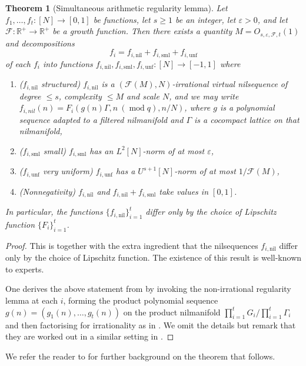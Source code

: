 \documentclass[10pt]{article}
\def\cF{\mathcal{F}}
\def\eps{\varepsilon}
\def\R{\mathbb{R}}
\def\nil{\mathrm{nil}}
\def\unf{\mathrm{unf}}
\def\sml{\mathrm{sml}}
\DeclareMathOperator\mo{mod}
\newtheorem{thm}[firstthm]{Theorem}
\begin{document}
\begin{thm}[Simultaneous arithmetic regularity lemma]\label{t:arl}
Let $f_1, \ldots, f_t: [N] \to [0,1]$ be functions, let $s \geq 1$ be an integer, let $\eps > 0$, and let $\cF: \R^+ \to \R^+$ be a growth function. Then there exists a quantity $M=O_{s,\eps,\cF,t}(1)$ and  decompositions 
\[f_i = f_{i,\nil} + f_{i,\sml} + f_{i,\unf} \]
of each $f_i$ into functions $f_{i, \nil}, f_{i, \sml}, f_{i,\unf}: [N] \to [-1,1]$ where 
\begin{enumerate}
\item($f_{i,\nil}$ structured) $f_{i,\nil}$ is a $(\cF(M), N)$-irrational virtual nilsequence of degree $\leq s$, complexity $\leq M$ and scale $N$, and we may write $f_{i,nil}(n) = F_i(g(n) \Gamma, n \ (\mo q), n/N)$, where $g$ is a polynomial sequence adapted to a filtered nilmanifold and $\Gamma$ is a cocompact lattice on that nilmanifold,
\item($f_{i,\sml}$ small) $f_{i,\sml}$ has an $L^2[N]$-norm of at most $\eps$,
\item($f_{i,\unf}$ very uniform) $f_{i,\unf}$ has a $U^{s+1}[N]$-norm of at most $1/\cF(M)$,
\item(Nonnegativity) $f_{i,\nil}$ and $f_{i,\nil} + f_{i,\sml}$ take values in $[0,1]$.
\end{enumerate}
In particular, the  functions $\{f_{i,\nil}\}_{i=1}^t$ differ only by the choice of Lipschitz function $\{F_i\}_{i=1}^t$. 
\end{thm}
\begin{proof}
This is \cite[Theorem 1.2]{GT10} together with the extra ingredient that the nilsequences $f_{i,\nil}$ differ only by the choice of Lipschitz function. The existence of  this result is well-known to experts. 

One derives the above statement from \cite{GT10} by invoking the non-irrational regularity lemma \cite[Proposition 2.7]{GT10} at each $i$, forming the product polynomial sequence $g(n) = (g_1(n), \ldots, g_t(n))$ on the product nilmanifold $\prod_{i=1}^t G_i/\prod_{i=1}^t \Gamma_i$ and then factorising for irrationality as in \cite[Chapter 2]{GT10}. We omit the details but remark that they are worked out in a similar setting in \cite[Appendix A]{K20}.
\end{proof}

We refer the reader to \cite{GT10} for further background on the theorem that follows. 
\end{document}
